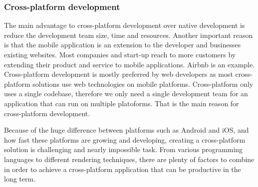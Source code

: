 \subsubsection{Cross-platform development}
\par{
    The main advantage to cross-platform development over native development is reduce the development team size, time and resources. Another important reason is that the mobile application is an extension to the developer and businesses existing websites. Most companies and start-up reach to more customers by extending their product and service to mobile applications. Airbnb is an example.
    Cross-platform development is mostly preferred by web developers as most cross-platform solutions use web technologies on mobile platforms.
    Cross-platform only uses a single codebase, therefore we only need a single development team for an application that can run on multiple platoforms.
    That is the main reason for cross-platform development.

    Because of the huge difference between platforms such as Android and iOS, and how fast these platforms are growing and developing, creating a cross-platform solution is challenging and nearly impossible task. From various programming languages to different rendering techniques, there are plenty of factors to combine in order to achieve a cross-platform application that can be productive in the long term.
}


